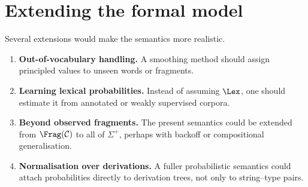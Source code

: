 \section{Extending the formal model}
Several extensions would make the semantics more realistic.
\begin{enumerate}[label=(\roman*)]
    \item \textbf{Out-of-vocabulary handling.} A smoothing method should assign principled values to
    unseen words or fragments.
    \item \textbf{Learning lexical probabilities.} Instead of assuming $\Lex$, one should estimate it from
    annotated or weakly supervised corpora.
    \item \textbf{Beyond observed fragments.} The present semantics could be extended from
    $\Frag(\mathcal C)$ to all of $\Sigma^+$, perhaps with backoff or compositional generalisation.
    \item \textbf{Normalisation over derivations.} A fuller probabilistic semantics could attach
    probabilities directly to derivation trees, not only to string--type pairs.
\end{enumerate}

